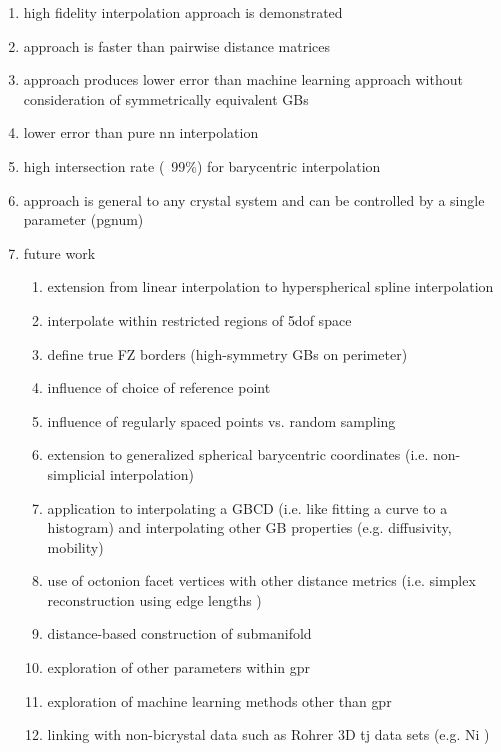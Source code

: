 \documentclass[preprint,12pt]{elsarticle}
\begin{document}
\begin{enumerate}
    \item high fidelity interpolation approach is demonstrated
    \item approach is faster than pairwise distance matrices
    \item approach produces lower error than machine learning approach without consideration of symmetrically equivalent GBs
    \item lower error than pure \gls{nn} interpolation
    \item high intersection rate (~99\%) for barycentric interpolation
    \item approach is general to any crystal system and can be controlled by a single parameter (pgnum)
    \item future work
    \begin{enumerate}
        \item extension from linear interpolation to hyperspherical spline interpolation \cite{Taijeron1994SplineHyperspheres}
        \item interpolate within restricted regions of \gls{5dof} space
        \item define true FZ borders (high-symmetry GBs on perimeter)
        \item influence of choice of reference point
        \item influence of regularly spaced points vs. random sampling
        \item extension to generalized spherical barycentric coordinates (i.e. non-simplicial interpolation) \cite{Langer2006SphericalCoordinates}
        \item application to interpolating a GBCD (i.e. like fitting a curve to a histogram) and interpolating other GB properties (e.g. diffusivity, mobility)
        \item use of octonion facet vertices with other distance metrics (i.e. simplex reconstruction using edge lengths \cite{Connor2017High-dimensionalSearch})
        \item distance-based construction of submanifold \cite{Boissonnat2017OnlySubmanifolds}
        \item exploration of other parameters within \gls{gpr}
        \item exploration of machine learning methods other than \gls{gpr}
        \item linking with non-bicrystal data such as Rohrer 3D \gls{tj} data sets (e.g. Ni \cite{Li2009RelativeNickel})
    \end{enumerate}
\end{enumerate}
\end{document}
